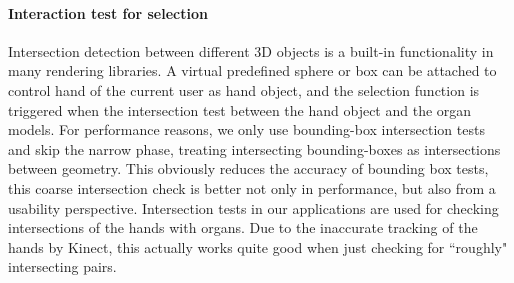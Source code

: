 \paragraph{Interaction test for selection}
Intersection detection between different 3D objects is a built-in functionality in many rendering libraries. A virtual predefined sphere or box can be attached to control hand of the current user as hand object, and the selection function is triggered when the intersection test between the hand object and the organ models. 
For performance reasons, we only use bounding-box intersection tests and skip the narrow phase, treating intersecting bounding-boxes as intersections between geometry. This obviously reduces the accuracy of bounding box tests, this coarse intersection check is better not only in performance, but also from a usability perspective. Intersection tests in our applications are used for checking intersections of the hands with organs. Due to the inaccurate tracking of the hands by Kinect, this actually works quite good when just checking for ``roughly" intersecting pairs.

